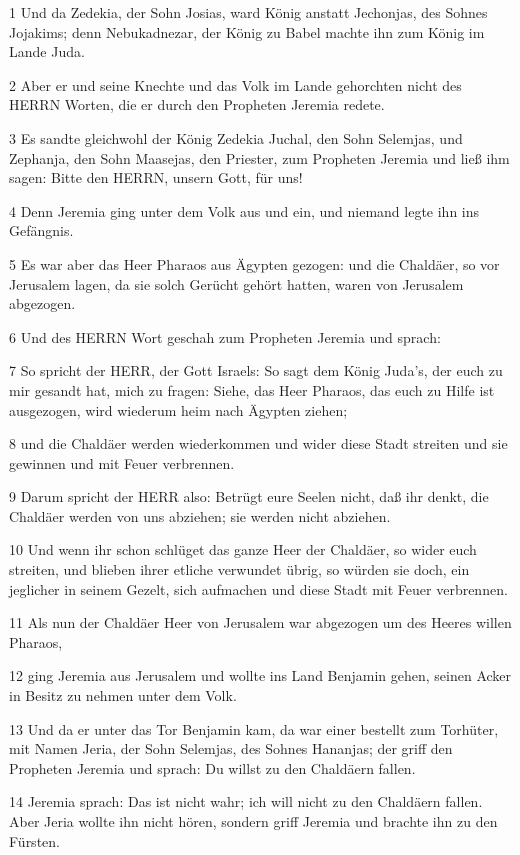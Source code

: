 \par 1 Und da Zedekia, der Sohn Josias, ward König anstatt Jechonjas, des Sohnes Jojakims; denn Nebukadnezar, der König zu Babel machte ihn zum König im Lande Juda.
\par 2 Aber er und seine Knechte und das Volk im Lande gehorchten nicht des HERRN Worten, die er durch den Propheten Jeremia redete.
\par 3 Es sandte gleichwohl der König Zedekia Juchal, den Sohn Selemjas, und Zephanja, den Sohn Maasejas, den Priester, zum Propheten Jeremia und ließ ihm sagen: Bitte den HERRN, unsern Gott, für uns!
\par 4 Denn Jeremia ging unter dem Volk aus und ein, und niemand legte ihn ins Gefängnis.
\par 5 Es war aber das Heer Pharaos aus Ägypten gezogen: und die Chaldäer, so vor Jerusalem lagen, da sie solch Gerücht gehört hatten, waren von Jerusalem abgezogen.
\par 6 Und des HERRN Wort geschah zum Propheten Jeremia und sprach:
\par 7 So spricht der HERR, der Gott Israels: So sagt dem König Juda's, der euch zu mir gesandt hat, mich zu fragen: Siehe, das Heer Pharaos, das euch zu Hilfe ist ausgezogen, wird wiederum heim nach Ägypten ziehen;
\par 8 und die Chaldäer werden wiederkommen und wider diese Stadt streiten und sie gewinnen und mit Feuer verbrennen.
\par 9 Darum spricht der HERR also: Betrügt eure Seelen nicht, daß ihr denkt, die Chaldäer werden von uns abziehen; sie werden nicht abziehen.
\par 10 Und wenn ihr schon schlüget das ganze Heer der Chaldäer, so wider euch streiten, und blieben ihrer etliche verwundet übrig, so würden sie doch, ein jeglicher in seinem Gezelt, sich aufmachen und diese Stadt mit Feuer verbrennen.
\par 11 Als nun der Chaldäer Heer von Jerusalem war abgezogen um des Heeres willen Pharaos,
\par 12 ging Jeremia aus Jerusalem und wollte ins Land Benjamin gehen, seinen Acker in Besitz zu nehmen unter dem Volk.
\par 13 Und da er unter das Tor Benjamin kam, da war einer bestellt zum Torhüter, mit Namen Jeria, der Sohn Selemjas, des Sohnes Hananjas; der griff den Propheten Jeremia und sprach: Du willst zu den Chaldäern fallen.
\par 14 Jeremia sprach: Das ist nicht wahr; ich will nicht zu den Chaldäern fallen. Aber Jeria wollte ihn nicht hören, sondern griff Jeremia und brachte ihn zu den Fürsten.
